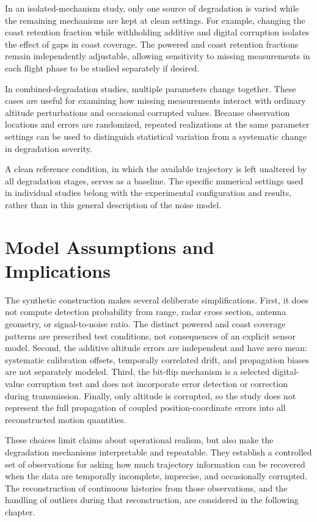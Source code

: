 In an isolated-mechanism study, only one source of degradation
is varied while the remaining mechanisms are kept at clean
settings. For example, changing the coast retention fraction
while withholding additive and digital corruption isolates the
effect of gaps in coast coverage. The powered and coast retention
fractions remain independently adjustable, allowing sensitivity
to missing measurements in each flight phase to be studied
separately if desired.

In combined-degradation studies, multiple parameters change
together. These cases are useful for examining how missing
measurements interact with ordinary altitude perturbations and
occasional corrupted values. Because observation locations
and errors are randomized, repeated realizations at the same
parameter settings can be used to distinguish statistical
variation from a systematic change in degradation severity.

A clean reference condition, in which the available trajectory
is left unaltered by all degradation stages, serves as a
baseline. The specific numerical settings used in individual
studies belong with the experimental configuration and results,
rather than in this general description of the noise model.

\section{Model Assumptions and Implications}
\label{sec:noise-limitations}

The synthetic construction makes several
deliberate simplifications. First, it
does not compute detection probability
from range, radar cross section,
antenna geometry, or signal-to-noise
ratio. The distinct powered and coast
coverage patterns are prescribed test
conditions, not consequences of an
explicit sensor model. Second, the
additive altitude errors are independent
and have zero mean: systematic
calibration offsets, temporally
correlated drift, and propagation biases
are not separately modeled. Third,
the bit-flip mechanism is a selected
digital-value corruption test and
does not incorporate error detection
or correction during transmission.
Finally, only altitude is corrupted,
so the study does not represent
the full propagation of coupled
position-coordinate errors into
all reconstructed motion quantities.

These choices limit claims about
operational realism, but also make
the degradation mechanisms
interpretable and repeatable.
They establish a controlled set of
observations for asking how much
trajectory information can be
recovered when the data are
temporally incomplete, imprecise,
and occasionally corrupted.
The reconstruction of continuous
histories from those observations,
and the handling of outliers during
that reconstruction, are considered
in the following chapter.
